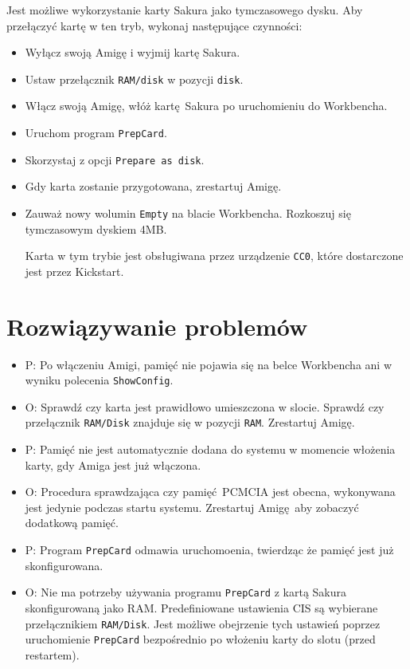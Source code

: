 \documentclass[10pt,a4paper]{article}
\begin{document}
Jest możliwe wykorzystanie karty Sakura jako tymczasowego dysku. Aby przełączyć kartę w ten tryb, wykonaj następujące czynności:
\begin{itemize}
	\item Wyłącz swoją Amigę i wyjmij kartę Sakura.
	\item Ustaw przełącznik {\tt RAM/disk} w pozycji {\tt disk}.
	\item Włącz swoją Amigę, włóż kartę Sakura po uruchomieniu do Workbencha.
	\item Uruchom program {\tt PrepCard}.
	\item Skorzystaj z opcji {\tt Prepare as disk}.
	\item Gdy karta zostanie przygotowana, zrestartuj Amigę.
	\item Zauważ nowy wolumin {\tt Empty} na blacie Workbencha. Rozkoszuj się tymczasowym dyskiem 4MB.

Karta w tym trybie jest obsługiwana przez urządzenie {\tt CC0}, które dostarczone jest przez Kickstart.
\end{itemize}

\section*{Rozwiązywanie problemów}

\begin{itemize}
	\item P: Po włączeniu Amigi, pamięć nie pojawia się na belce Workbencha ani w wyniku polecenia {\tt ShowConfig}.
	\item O: Sprawdź czy karta jest prawidłowo umieszczona w slocie. Sprawdź czy przełącznik {\tt RAM/Disk} znajduje się w pozycji {\tt RAM}. Zrestartuj Amigę.
\end{itemize}

\begin{itemize}
	\item P: Pamięć nie jest automatycznie dodana do systemu w momencie włożenia karty, gdy Amiga jest już włączona.
	\item O: Procedura sprawdzająca czy pamięć PCMCIA jest obecna, wykonywana jest jedynie podczas startu systemu. Zrestartuj Amigę aby zobaczyć dodatkową pamięć. 
\end{itemize}

\begin{itemize}
	\item P: Program {\tt PrepCard} odmawia uruchomoenia, twierdząc że pamięć jest już skonfigurowana.
	\item O: Nie ma potrzeby używania programu {\tt PrepCard} z kartą Sakura skonfigurowaną jako RAM. Predefiniowane ustawienia CIS są wybierane przełącznikiem {\tt RAM/Disk}. Jest możliwe obejrzenie tych ustawień poprzez uruchomienie {\tt PrepCard} bezpośrednio po włożeniu karty do slotu (przed restartem). 
\end{itemize}
\end{document}
